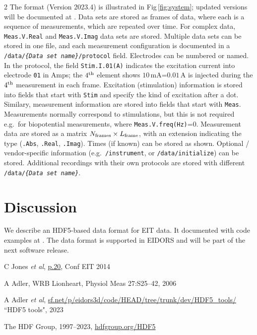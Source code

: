 \documentclass[10pt,a4paper]{article}
\renewenvironment{thebibliography}[1]{%
    \begin{oldthebibliography}{#1}%
      \setlength{\parskip}{0ex}%
      \setlength{\itemsep}{0ex}%
  }%
  {%
    \end{oldthebibliography}%
  }
\begin{document}
\begin{multicols}{2}
The format (Version 2023.4) is illustrated in Fig\,\ref{fig:system};
updated versions will be documented at \cite{Adler2023HDF5}.
Data sets are stored as frames of data, where each is a sequence
of measurements,
which are repeated over time. For complex data, 
{\tt Meas.V.Real}
and 
{\tt Meas.V.Imag}
data sets are stored.
 Multiple data sets can be stored in one file,
and each measurement configuration is documented in a 
{\tt /data/\emph{\{Data set name\}}/protocol} field.
Electrodes can be numbered or named. In the
protocol, the field
 {\tt Stim.I.01(A)} indicates the excitation current into electrode {\tt 01} in Amps;
 the $4^{\rm th}$ element shows $10$\,mA=$0.01$\,A is injected
during the 
     $4^{\rm th}$ measurement in each frame.
Excitation (stimulation) information is stored into fields that start with
{\tt Stim} and specify the kind of excitation after a dot.
Similary, measurement information are stored into fields that start with {\tt Meas}.
Measurements normally correspond to stimulations, but this
is not required e.g.\ for biopotential measurements, where
{\tt Meas.V.freq(Hz)}=0.
Measurement data are stored as a matrix
 $N_{\rm frames}\times L_{\rm frame}$,
with an extension indicating the type
({\tt .Abs}, {\tt .Real}, {\tt .Imag}).
Times (if known) can be stored as shown.
Optional / vendor-specific information
 (e.g.\ {\tt /instrument}, or
       {\tt /data/initialize})
can be stored.
Additional recordings with their own protocols are stored with different 
{\tt /data/\emph{\{Data set name\}}}.

\section{Discussion}

We describe an HDF5-based data format for EIT data.
It documented with code examples at \cite{Adler2023HDF5}.
The data format is supported in EIDORS \cite{Adler2006EIDORS}
and will be part of the next software release.


\footnotesize
%
%
\begin{thebibliography}{}
C Jones \emph{et al},
\href{https://cudo.carleton.ca/eit2014/3311}{p.20}, Conf EIT 2014

A Adler, WRB Lionheart, 
Physiol Meas 27:S25--42, 2006

A Adler \emph{et al},
\href{https://sourceforge.net/p/eidors3d/code/HEAD/tree/trunk/dev/HDF5\_tools}
                      {sf.net/p/eidors3d/code/HEAD/tree/trunk/dev/HDF5\_tools/}
``HDF5 tools", 2023

The HDF Group,
1997--2023,
\href{http://www.hdfgroup.org/HDF5}
                {hdfgroup.org/HDF5}

\end{thebibliography}
\end{multicols}
\end{document}
